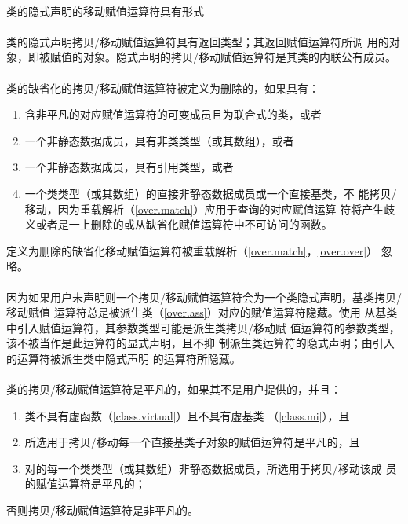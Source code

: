\paragraph{}
类的隐式声明的移动赋值运算符具有形式                                    \\
\mbox{}

\paragraph{}
类的隐式声明拷贝/移动赋值运算符具有返回类型；其返回赋值运算符所调
用的对象，即被赋值的对象。隐式声明的拷贝/移动赋值运算符是其类的内联公有成员。

\paragraph{}
类的缺省化的拷贝/移动赋值运算符被定义为删除的，如果具有：
\begin{enumerate}
  \item{含非平凡的对应赋值运算符的可变成员且为联合式的类，或者}
  \item{一个非静态数据成员，具有非类类型（或其数组），或者}
  \item{一个非静态数据成员，具有引用类型，或者}
  \item{一个类类型（或其数组）的直接非静态数据成员或一个直接基类，不
    能拷贝/移动，因为重载解析（\ref{over.match}）应用于查询的对应赋值运算
    符将产生歧义或者是一上删除的或从缺省化赋值运算符中不可访问的函数。}
\end{enumerate}
定义为删除的缺省化移动赋值运算符被重载解析（\ref{over.match}，\ref{over.over}）
忽略。

\paragraph{}
因为如果用户未声明则一个拷贝/移动赋值运算符会为一个类隐式声明，基类拷贝/移动赋值
运算符总是被派生类（\ref{over.ass}）对应的赋值运算符隐藏。使用
从基类中引入赋值运算符，其参数类型可能是派生类拷贝/移动赋
值运算符的参数类型，该不被当作是此运算符的显式声明，且不抑
制派生类运算符的隐式声明；由引入的运算符被派生类中隐式声明
的运算符所隐藏。

\paragraph{}
类的拷贝/移动赋值运算符是平凡的，如果其不是用户提供的，并且：
\begin{enumerate}
  \item{类不具有虚函数（\ref{class.virtual}）且不具有虚基类
    （\ref{class.mi}），且}
  \item{所选用于拷贝/移动每一个直接基类子对象的赋值运算符是平凡的，且}
  \item{对的每一个类类型（或其数组）非静态数据成员，所选用于拷贝/移动该成
    员的赋值运算符是平凡的；}
\end{enumerate}
否则拷贝/移动赋值运算符是非平凡的。

